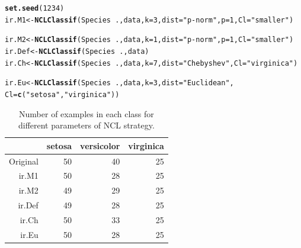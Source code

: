 \documentclass[10pt,a4paper]{article}\usepackage[]{graphicx}\usepackage[]{color}
\makeatletter
\newcommand{\hlnum}[1]{\textcolor[rgb]{0.686,0.059,0.569}{#1}}%
\newcommand{\hlstr}[1]{\textcolor[rgb]{0.192,0.494,0.8}{#1}}%
\newcommand{\hlopt}[1]{\textcolor[rgb]{0,0,0}{#1}}%
\newcommand{\hlstd}[1]{\textcolor[rgb]{0.345,0.345,0.345}{#1}}%
\newcommand{\hlkwb}[1]{\textcolor[rgb]{0.69,0.353,0.396}{#1}}%
\newcommand{\hlkwc}[1]{\textcolor[rgb]{0.333,0.667,0.333}{#1}}%
\newcommand{\hlkwd}[1]{\textcolor[rgb]{0.737,0.353,0.396}{\textbf{#1}}}%
\newenvironment{kframe}{%
 \def\at@end@of@kframe{}%
 \ifinner\ifhmode%
  \def\at@end@of@kframe{\end{minipage}}%
  \begin{minipage}{\columnwidth}%
 \fi\fi%
 \def\FrameCommand##1{\hskip\@totalleftmargin \hskip-\fboxsep
 \colorbox{shadecolor}{##1}\hskip-\fboxsep
     \hskip-\linewidth \hskip-\@totalleftmargin \hskip\columnwidth}%
 \MakeFramed {\advance\hsize-\width
   \@totalleftmargin\z@ \linewidth\hsize
   \@setminipage}}%
 {\par\unskip\endMakeFramed%
 \at@end@of@kframe}
\newenvironment{knitrout}{}{} %
\makeatother
\begin{document}
\begin{knitrout}\footnotesize
{}\color{fgcolor}\begin{kframe}
\begin{alltt}
\hlkwd{set.seed}\hlstd{(}\hlnum{1234}\hlstd{)}
\hlstd{ir.M1} \hlkwb{<-} \hlkwd{NCLClassif}\hlstd{(Species}\hlopt{~}\hlstd{., data,} \hlkwc{k}\hlstd{=}\hlnum{3}\hlstd{,} \hlkwc{dist}\hlstd{=}\hlstr{"p-norm"}\hlstd{,} \hlkwc{p}\hlstd{=}\hlnum{1}\hlstd{,} \hlkwc{Cl}\hlstd{=}\hlstr{"smaller"}\hlstd{)}
\end{alltt}


{\ttfamily\noindent\color{warningcolor}{\#\# Warning in ENNClassif(form, data[which(data[, tgt] \%in\% otherCl), ], k, : There are no examples to remove!}}\begin{alltt}
\hlstd{ir.M2}\hlkwb{<-} \hlkwd{NCLClassif}\hlstd{(Species}\hlopt{~}\hlstd{., data,} \hlkwc{k}\hlstd{=}\hlnum{1}\hlstd{,} \hlkwc{dist}\hlstd{=}\hlstr{"p-norm"}\hlstd{,} \hlkwc{p}\hlstd{=}\hlnum{1}\hlstd{,} \hlkwc{Cl}\hlstd{=}\hlstr{"smaller"}\hlstd{)}
\hlstd{ir.Def} \hlkwb{<-} \hlkwd{NCLClassif}\hlstd{(Species}\hlopt{~}\hlstd{., data)}
\hlstd{ir.Ch} \hlkwb{<-} \hlkwd{NCLClassif}\hlstd{(Species}\hlopt{~}\hlstd{., data,} \hlkwc{k}\hlstd{=}\hlnum{7}\hlstd{,} \hlkwc{dist}\hlstd{=}\hlstr{"Chebyshev"}\hlstd{,} \hlkwc{Cl}\hlstd{=}\hlstr{"virginica"}\hlstd{)}
\end{alltt}


{\ttfamily\noindent\color{warningcolor}{\#\# Warning in ENNClassif(form, data[which(data[, tgt] \%in\% otherCl), ], k, : There are no examples to remove!}}\begin{alltt}
\hlstd{ir.Eu} \hlkwb{<-} \hlkwd{NCLClassif}\hlstd{(Species}\hlopt{~}\hlstd{., data,} \hlkwc{k}\hlstd{=}\hlnum{3}\hlstd{,} \hlkwc{dist}\hlstd{=}\hlstr{"Euclidean"}\hlstd{,}
                    \hlkwc{Cl}\hlstd{=}\hlkwd{c}\hlstd{(}\hlstr{"setosa"}\hlstd{,} \hlstr{"virginica"}\hlstd{))}
\end{alltt}
\end{kframe}
\end{knitrout}


\begin{table}[ht]
\centering
\begin{tabular}{rrrr}
  \hline
 & setosa & versicolor & virginica \\ 
  \hline
Original &  50 &  40 &  25 \\ 
  ir.M1 &  50 &  28 &  25 \\ 
  ir.M2 &  49 &  29 &  25 \\ 
  ir.Def &  49 &  28 &  25 \\ 
  ir.Ch &  50 &  33 &  25 \\ 
  ir.Eu &  50 &  28 &  25 \\ 
   \hline
\end{tabular}
\caption{Number of examples in each class for different parameters of NCL strategy.} 
\label{tab:iris_NCL_table}
\end{table}
\end{document}
